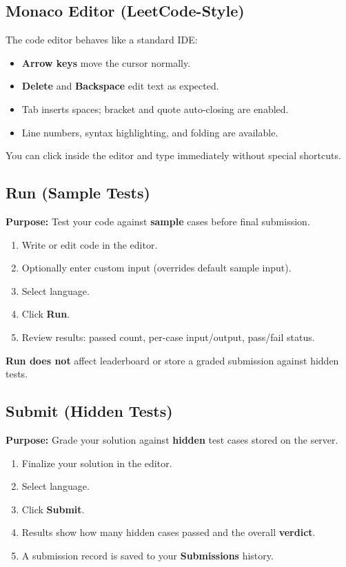 \documentclass[11pt,a4paper]{article}
\begin{document}
\subsection{Monaco Editor (LeetCode-Style)}
The code editor behaves like a standard IDE:
\begin{itemize}[noitemsep]
  \item \textbf{Arrow keys} move the cursor normally.
  \item \textbf{Delete} and \textbf{Backspace} edit text as expected.
  \item Tab inserts spaces; bracket and quote auto-closing are enabled.
  \item Line numbers, syntax highlighting, and folding are available.
\end{itemize}

You can click inside the editor and type immediately without special shortcuts.

\subsection{Run (Sample Tests)}
\textbf{Purpose:} Test your code against \textbf{sample} cases before final submission.

\begin{enumerate}
  \item Write or edit code in the editor.
  \item Optionally enter custom input (overrides default sample input).
  \item Select language.
  \item Click \textbf{Run}.
  \item Review results: passed count, per-case input/output, pass/fail status.
\end{enumerate}

\textbf{Run does not} affect leaderboard or store a graded submission against hidden tests.

\subsection{Submit (Hidden Tests)}
\textbf{Purpose:} Grade your solution against \textbf{hidden} test cases stored on the server.

\begin{enumerate}
  \item Finalize your solution in the editor.
  \item Select language.
  \item Click \textbf{Submit}.
  \item Results show how many hidden cases passed and the overall \textbf{verdict}.
  \item A submission record is saved to your \textbf{Submissions} history.
\end{enumerate}
\end{document}
